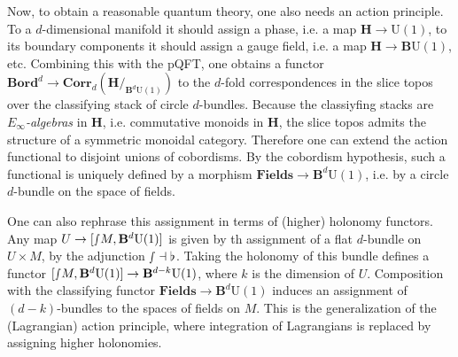     Now, to obtain a reasonable quantum theory, one also needs an action principle. To a $d$-dimensional manifold it should assign a phase, i.e. a map $\mathbf{H}\rightarrow\mathrm{U}(1)$, to its boundary components it should assign a gauge field, i.e. a map $\mathbf{H}\rightarrow\mathbf{B}\mathrm{U}(1)$, etc. Combining this with the pQFT, one obtains a functor $\mathbf{Bord}^d\rightarrow\mathbf{Corr}_d(\mathbf{H}/_{\mathbf{B}^d\mathrm{U}(1)})$ to the $d$-fold correspondences in the slice topos over the classifying stack of circle $d$-bundles. Because the classiyfing stacks are \textit{$E_\infty$-algebras} in $\mathbf{H}$, i.e. commutative monoids in $\mathbf{H}$, the slice topos admits the structure of a symmetric monoidal category. Therefore one can extend the action functional to disjoint unions of cobordisms.
    By the cobordism hypothesis, such a functional is uniquely defined by a morphism $\mathbf{Fields}\rightarrow\mathbf{B}^d\mathrm{U}(1)$, i.e. by a circle $d$-bundle on the space of fields.

    One can also rephrase this assignment in terms of (higher) holonomy functors. Any map $U\rightarrow[\smallint\!M,\mathbf{B}^d\mathrm{U}(1)]$ is given by th assignment of a flat $d$-bundle on $U\times M$, by the adjunction $\smallint\dashv\flat$. Taking the holonomy of this bundle defines a functor $[\smallint\!M,\mathbf{B}^d\mathrm{U}(1)]\rightarrow\mathbf{B}^{d-k}\mathrm{U}(1)$, where $k$ is the dimension of $U$. Composition with the classifying functor $\mathbf{Fields}\rightarrow\mathbf{B}^d\mathrm{U}(1)$ induces an assignment of $(d-k)$-bundles to the spaces of fields on $M$. This is the generalization of the (Lagrangian) action principle, where integration of Lagrangians is replaced by assigning higher holonomies.